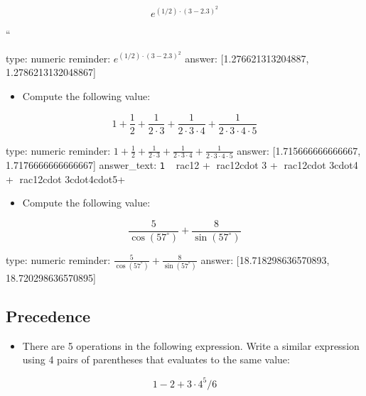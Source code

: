 \documentclass[12pt]{article}
\begin{document}
\[
e^{(1/2)\cdot(3 - 2.3)^2}
\]

``

\begin{answer}
    type: numeric
    reminder: \( e^{(1/2)\cdot(3 - 2.3)^2} \)
    answer: [1.276621313204887, 1.2786213132048867]

\end{answer}

\begin{itemize}
\itemsep1pt\parskip0pt
\item
  Compute the following value:
\end{itemize}

\[
1 + \frac{1}{2} + \frac{1}{2\cdot 3} + \frac{1}{2\cdot 3\cdot4} + \frac{1}{2\cdot 3\cdot4\cdot5}
\]

\begin{answer}
    type: numeric
    reminder: \(1 + \frac{1}{2} + \frac{1}{2\cdot 3} + \frac{1}{2\cdot 3\cdot4} + \frac{1}{2\cdot 3\cdot4\cdot5}\)
    answer: [1.715666666666667, 1.7176666666666667]
answer_text: \verb+1 + rac{1}{2} + rac{1}{2cdot 3} + rac{1}{2cdot 3cdot4} + rac{1}{2cdot 3cdot4cdot5}+ 
\end{answer}

\begin{itemize}
\itemsep1pt\parskip0pt
\item
  Compute the following value:
\end{itemize}

\[
\frac{5}{\cos(57^\circ)}  + \frac{8}{\sin(57^\circ)}
\]

\begin{answer}
    type: numeric
    reminder: \( \frac{5}{\cos(57^\circ)}  + \frac{8}{\sin(57^\circ)} \)
    answer: [18.718298636570893, 18.720298636570895]

\end{answer}

\subsection{Precedence}

\begin{itemize}
\itemsep1pt\parskip0pt
\item
  There are 5 operations in the following expression. Write a similar
  expression using 4 pairs of parentheses that evaluates to the same
  value:
\end{itemize}

\[
1 - 2 + 3 \cdot 4 ^ 5 / 6
\]
\end{document}
